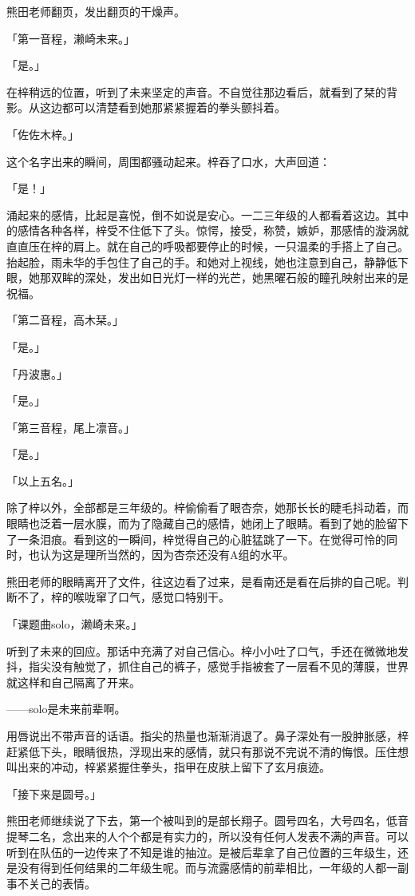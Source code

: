 \documentclass[UTF8]{ctexart}
\begin{document}
    熊田老师翻页，发出翻页的干燥声。

    「第一音程，濑崎未来。」

    「是。」

    在梓稍远的位置，听到了未来坚定的声音。不自觉往那边看后，就看到了栞的背影。从这边都可以清楚看到她那紧紧握着的拳头颤抖着。

    「佐佐木梓。」

    这个名字出来的瞬间，周围都骚动起来。梓吞了口水，大声回道：

    「是！」

    涌起来的感情，比起是喜悦，倒不如说是安心。一二三年级的人都看着这边。其中的感情各种各样，梓受不住低下了头。惊愕，接受，称赞，嫉妒，那感情的漩涡就直直压在梓的肩上。就在自己的呼吸都要停止的时候，一只温柔的手搭上了自己。抬起脸，雨未华的手包住了自己的手。和她对上视线，她也注意到自己，静静低下眼，她那双眸的深处，发出如日光灯一样的光芒，她黑曜石般的瞳孔映射出来的是祝福。

    「第二音程，高木栞。」

    「是。」

    「丹波惠。」

    「是。」

    「第三音程，尾上凛音。」

    「是。」

    「以上五名。」

    除了梓以外，全部都是三年级的。梓偷偷看了眼杏奈，她那长长的睫毛抖动着，而眼睛也泛着一层水膜，而为了隐藏自己的感情，她闭上了眼睛。看到了她的脸留下了一条泪痕。看到这的一瞬间，梓觉得自己的心脏猛跳了一下。在觉得可怜的同时，也认为这是理所当然的，因为杏奈还没有A组的水平。

    熊田老师的眼睛离开了文件，往这边看了过来，是看南还是看在后排的自己呢。判断不了，梓的喉咙窜了口气，感觉口特别干。

    「课题曲solo，濑崎未来。」

    听到了未来的回应。那话中充满了对自己信心。梓小小吐了口气，手还在微微地发抖，指尖没有触觉了，抓住自己的裤子，感觉手指被套了一层看不见的薄膜，世界就这样和自己隔离了开来。

    ——solo是未来前辈啊。

    用唇说出不带声音的话语。指尖的热量也渐渐消退了。鼻子深处有一股肿胀感，梓赶紧低下头，眼睛很热，浮现出来的感情，就只有那说不完说不清的悔恨。压住想叫出来的冲动，梓紧紧握住拳头，指甲在皮肤上留下了玄月痕迹。

    「接下来是圆号。」

    熊田老师继续说了下去，第一个被叫到的是部长翔子。圆号四名，大号四名，低音提琴二名，念出来的人个个都是有实力的，所以没有任何人发表不满的声音。可以听到在队伍的一边传来了不知是谁的抽泣。是被后辈拿了自己位置的三年级生，还是没有得到任何结果的二年级生呢。而与流露感情的前辈相比，一年级的人都一副事不关己的表情。
\end{document}
